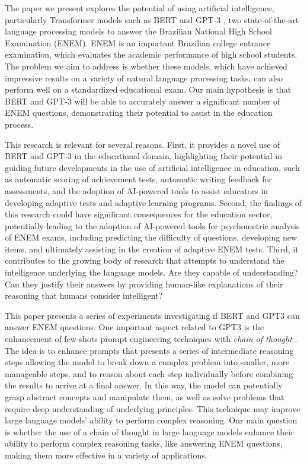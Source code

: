 \documentclass{article}
\begin{document}
The paper we present explores the potential of using artificial intelligence, particularly Transformer models \cite{VaswaniAttentionAllYou2017a} such as BERT  \cite{devlin2018bert} and GPT-3 \cite{https://doi.org/10.48550/arxiv.2005.14165}, two state-of-the-art language processing models to answer the Brazilian National High School Examination (ENEM). ENEM is an important Brazilian college entrance examination, which evaluates the academic performance of high school students. The problem we aim to address is whether these models, which have achieved impressive results on a variety of natural language processing tasks, can also perform well on a standardized educational exam. Our main hypothesis is that BERT and GPT-3 will be able to accurately answer a significant number of ENEM questions, demonstrating their potential to assist in the education process.

This research is relevant for several reasons. First, it provides a novel use of BERT and GPT-3 in the educational domain, highlighting their potential in guiding future developments in the use of artificial intelligence in education, such as automatic scoring of achievement tests, automatic writing feedback for assessments, and the adoption of AI-powered tools to assist educators in developing adaptive tests and adaptive learning programs. Second, the findings of this research could have significant consequences for the education sector, potentially leading to the adoption of AI-powered tools for psychometric analysis of ENEM exams, including predicting the difficulty of questions, developing new items, and ultimately assisting in the creation of adaptive ENEM tests. Third, it contributes to the growing body of research that attempts to understand the intelligence underlying the language models. Are they capable of understanding? Can they justify their answers by providing human-like explanations of their reasoning that humans consider intelligent?  
 
This paper presents a series of experiments investigating if BERT and GPT3 can answer ENEM questions. One important aspect related to GPT3 is the enhancement of few-shots prompt engineering techniques with \textit{chain of thought} \cite{DBLP:journals/corr/abs-2201-11903}. The idea is to enhance prompts that presents a series of intermediate reasoning steps allowing the model to break down a complex problem into smaller, more manageable steps, and to reason about each step individually before combining the results to arrive at a final answer.  In this way, the model can potentially grasp abstract concepts and manipulate them, as well as solve problems that require deep understanding of underlying principles.  This technique may improve large language models' ability to perform complex reasoning. Our main question is whether the use of a chain of thought in large language models enhance their ability to perform complex reasoning tasks, like answering ENEM questions, making them more effective in a variety of applications.
\end{document}
